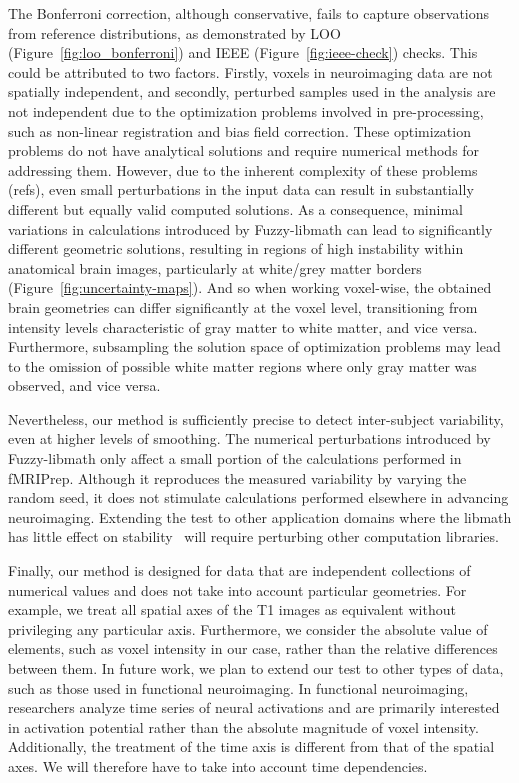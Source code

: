 \documentclass[lettersize,journal]{IEEEtran}
\newcommand{\fmriprep}{fMRIPrep\xspace}
\begin{document}
The Bonferroni correction, although conservative, fails to capture observations from reference distributions, as demonstrated by LOO (Figure~\ref{fig:loo_bonferroni}) and IEEE (Figure~\ref{fig:ieee-check}) checks. This could be attributed to two factors. Firstly, voxels in neuroimaging data are not spatially independent, and secondly, perturbed samples used in the analysis are not independent due to the optimization problems involved in pre-processing, such as non-linear registration and bias field correction. These optimization problems do not have analytical solutions and require numerical methods for addressing them. However, due to the inherent complexity of these problems (refs), even small perturbations in the input data can result in substantially different but equally valid computed solutions. As a consequence, minimal variations in calculations introduced by Fuzzy-libmath can lead to significantly different geometric solutions, resulting in regions of high instability within anatomical brain images, particularly at white/grey matter borders (Figure~\ref{fig:uncertainty-maps}). And so when working voxel-wise, the obtained brain geometries can differ significantly at the voxel level, transitioning from intensity levels characteristic of gray matter to white matter, and vice versa. Furthermore, subsampling the solution space of optimization problems may lead to the omission of possible white matter regions where only gray matter was observed, and vice versa.

Nevertheless, our method is sufficiently precise to detect inter-subject variability, even at higher levels of smoothing. The numerical perturbations introduced by Fuzzy-libmath only affect a small portion of the calculations performed in \fmriprep. Although it reproduces the measured variability by varying the random seed, it does not stimulate calculations performed elsewhere in advancing neuroimaging. Extending the test to other application domains where the libmath has little effect on stability~\cite{pepe2022numerical} will require perturbing other computation libraries.

Finally, our method is designed for data that are independent collections of numerical values and does not take into account particular geometries. For example, we treat all spatial axes of the T1 images as equivalent without privileging any particular axis. Furthermore, we consider the absolute value of elements, such as voxel intensity in our case, rather than the relative differences between them. In future work, we plan to extend our test to other types of data, such as those used in functional neuroimaging. In functional neuroimaging, researchers analyze time series of neural activations and are primarily interested in activation potential rather than the absolute magnitude of voxel intensity. Additionally, the treatment of the time axis is different from that of the spatial axes. We will therefore have to take into account time dependencies.
\end{document}
